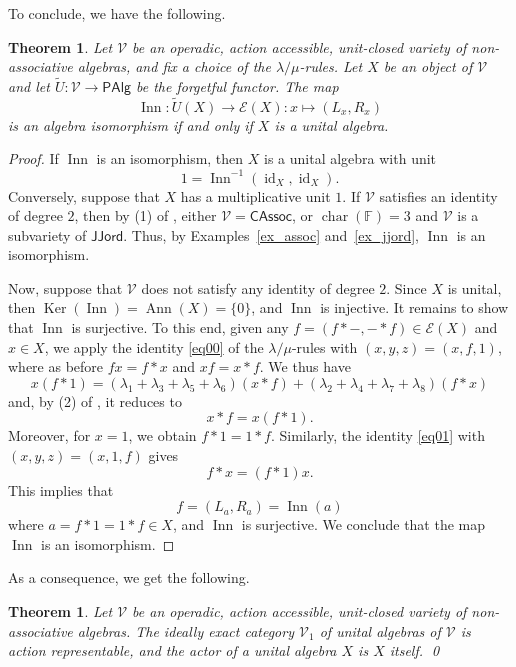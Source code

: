 \documentclass[reqno,a4paper]{amsart}
\theoremstyle{plain}
\newtheorem{theorem}[subsection]{Theorem}
\theoremstyle{definition}
\theoremstyle{remark}
\numberwithin{equation}{section}
\newcommand{\noproof}{\hfil\qed}
\newcommand{\F}{\mathbb{F}}
\newcommand{\E}{\mathcal{E}}
\newcommand{\V}{\mathcal{V}}
\DeclareMathOperator{\bchar}{char}
\DeclareMathOperator{\Ker}{Ker}
\DeclareMathOperator{\Inn}{Inn}
\DeclareMathOperator{\Ann}{Ann}
\DeclareMathOperator{\id}{id}
\newcommand{\CAssoc}{\ensuremath{\mathsf{CAssoc}}}
\newcommand{\JJord}{\ensuremath{\mathsf{JJord}}}
\newcommand{\PAlg}{\ensuremath{\mathsf{PAlg}}}
\begin{document}
To conclude, we have the following.

\begin{theorem}\label{thm_unital}
Let $\V$ be an operadic, action accessible, unit-closed variety of non-associative algebras, and fix a choice of the $\lambda/\mu$-rules. Let $X$ be an object of $\V$ and let $\widetilde{U} \colon \V \to \PAlg$ be the forgetful functor. The map
\[
\Inn \colon \widetilde{U}(X) \to \E(X) \colon x \mapsto (L_x,R_x)
\]
is an algebra isomorphism if and only if $X$ is a unital algebra.
\end{theorem}

\begin{proof}
If $\Inn$ is an isomorphism, then $X$ is a unital algebra with unit
\[
1=\Inn^{-1}(\id_X,\id_X).
\]
Conversely, suppose that $X$ has a multiplicative unit $1$. If $\V$ satisfies an identity of degree $2$, then by (1) of , either $\V=\CAssoc$, or $\bchar(\F)=3$ and $\V$ is a subvariety of $\JJord$. Thus, by Examples~\ref{ex_assoc} and~\ref{ex_jjord}, $\Inn$ is an isomorphism. 

Now, suppose that $\V$ does not satisfy any identity of degree $2$. Since $X$ is unital, then $\Ker(\Inn)=\Ann(X)=\{ 0 \}$, and $\Inn$ is injective. It remains to show that $\Inn$ is surjective. To this end, given any $f=(f \ast -, - \ast f) \in \E(X)$ and $x \in X$, we apply the identity \eqref{eq00} of the $\lambda/\mu$-rules with $(x,y,z)=(x,f,1)$, where as before $fx=f \ast x$ and $xf=x \ast f$. We thus have
\[
x(f \ast 1)=(\lambda_1+\lambda_3+\lambda_5+\lambda_6)(x \ast f)+(\lambda_2+\lambda_4+\lambda_7+\lambda_8)(f \ast x)
\]
and, by (2) of , it reduces to
\[
x \ast f=x(f \ast 1).
\]
Moreover, for $x=1$, we obtain $f \ast 1=1 \ast f$. Similarly, the identity \eqref{eq01} with $(x,y,z)=(x,1,f)$ gives
\[
f \ast x=(f \ast 1)x.
\]
This implies that
\[
f=(L_a,R_a)=\Inn(a)
\]
where $a=f \ast 1 = 1 \ast f \in X$, and $\Inn$ is surjective. We conclude that the map $\Inn$ is an isomorphism.
\end{proof}

As a consequence, we get the following.

\begin{theorem}\label{final_thm}
Let $\V$ be an operadic, action accessible, unit-closed variety of non-associative algebras. The ideally exact category $\V_1$ of unital algebras of $\V$ is action representable, and the actor of a unital algebra $X$ is $X$ itself. \noproof
\end{theorem}
\end{document}
